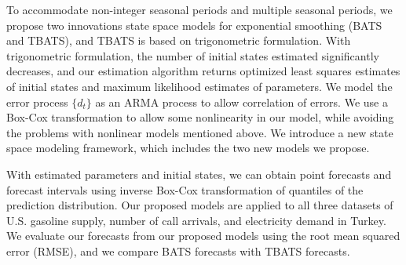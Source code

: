 \documentclass{uwstat572}
\begin{document}
To accommodate non-integer seasonal periods and multiple seasonal periods, we propose two innovations state space models for exponential smoothing (BATS and TBATS), and TBATS is based on trigonometric formulation. With trigonometric formulation, the number of initial states estimated significantly decreases, and our estimation algorithm returns optimized least squares estimates of initial states and maximum likelihood estimates of parameters. We model the error process $\{d_t\}$ as an ARMA process to allow correlation of errors. We use a Box-Cox transformation to allow some nonlinearity in our model, while avoiding the problems with nonlinear models mentioned above. We introduce a new state space modeling framework, which includes the two new models we propose.

With estimated parameters and initial states, we can obtain point forecasts and forecast intervals using inverse Box-Cox transformation of quantiles of the prediction distribution. Our proposed models are applied to all three datasets of U.S. gasoline supply, number of call arrivals, and electricity demand in Turkey. We evaluate our forecasts from our proposed models using the root mean squared error (RMSE), and we compare BATS forecasts with TBATS forecasts.

\nocite{*}


\end{document}
